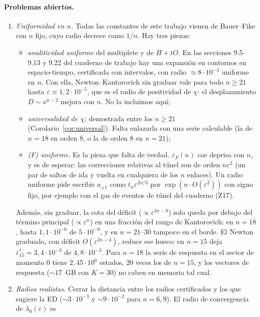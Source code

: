 \documentclass[11pt,a4paper]{article}
\theoremstyle{definition}
\theoremstyle{remark}
\newcommand{\eps}{\varepsilon}
\begin{document}
\paragraph{Problemas abiertos.}
\begin{enumerate}
\item \emph{Uniformidad en $n$.} Todas las constantes de este trabajo vienen de Bauer--Fike con $n$
  fijo, cuyo radio decrece como $1/n$. Hay tres piezas:
  \begin{itemize}
  \item \emph{analiticidad uniforme} del multiplete y de $H+tO$. En las secciones 9.5--9.13 y 9.22
    del cuaderno de trabajo hay una expansión en contornos en espacio-tiempo,
    certificada con intervalos, con radio $\approx8\cdot10^{-3}$ uniforme en $n$. Con ella,
    Newton--Kantorovich sin graduar vale para todo $n\ge21$ hasta $\eps\approx1{,}2\cdot10^{-5}$, que es el
    radio de positividad de $\chi$: el desplazamiento $D\sim\nu^{n-2}$ mejora con $n$. No la incluimos aquí;
  \item \emph{universalidad de $\chi$}: demostrada entre los $n\ge21$ (Corolario~\ref{cor:universal}). Falta
    enlazarla con una serie calculable (la de $n=18$ en orden $8$, o la de orden $8$ en $n=21$);
  \item \emph{(F) uniforme.} Es la pieza que falta de verdad. $\eps_F(n)$ cae deprisa con $n$, y es de
    esperar: las correcciones relativas al túnel son de orden $n\eps^2$ (un par de saltos de ida y vuelta
    en cualquiera de los $n$ enlaces). Un radio uniforme pide escribir $a_{\pm1}$ como $t_n\eps^{2n/3}$ por
    $\exp(n\cdot O(\eps^2))$ con signo fijo, por ejemplo con el gas de eventos de túnel del cuaderno (Z17).
  \end{itemize}
  Además, sin graduar, la cota del déficit ($\propto\eps^{2n-8}$) solo queda por debajo del término
  principal ($\propto\eps^n$) en una fracción del rango de Kantorovich: en $n=18$, hasta $1{,}1\cdot10^{-6}$ de
  $5\cdot10^{-6}$, y en $n=21$--$30$ tampoco en el borde. El Newton graduado, con déficit
  $O(\eps^{2n-4})$, reduce ese hueco: en $n=15$ deja $\eps_{15}^*=3{,}4\cdot10^{-3}$ de $4{,}8\cdot10^{-3}$.
  Para $n=18$ la serie de respuesta en el sector de momento $0$ tiene $2{,}45\cdot10^6$ estados, $20$ veces
  los de $n=15$, y los vectores de respuesta ($\sim17$~GB con $K=30$) no caben en memoria tal cual.
\item \emph{Radios realistas.} Cerrar la distancia entre los radios certificados y los que sugiere la
  ED ($\sim3\cdot10^{-3}$ y $\sim9\cdot10^{-2}$ para $n=6,9$). El radio de convergencia de $\lambda_0(\eps)$ es

\end{enumerate}
\end{document}
